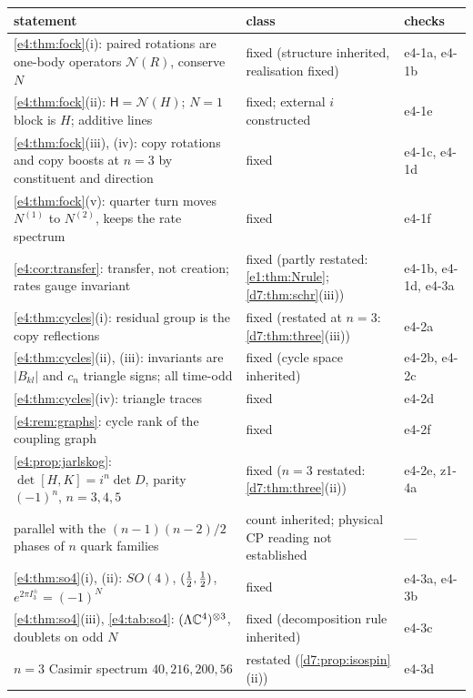 \begin{table}[htbp]
\centering
\footnotesize
\begin{tabular}{@{}>{\raggedright\arraybackslash}p{8.0cm}>{\raggedright\arraybackslash}p{4.8cm}>{\raggedright\arraybackslash}p{2.0cm}@{}}
\toprule
statement & class & checks\\
\midrule
\cref{e4:thm:fock}(i): paired rotations are one-body operators $\mathcal N(R)$, conserve $N$ & fixed (structure inherited, realisation fixed) & e4-1a, e4-1b\\
\cref{e4:thm:fock}(ii): $\mathsf H=\mathcal N(H)$; $N=1$ block is $H$; additive lines & fixed; external $i$ constructed & e4-1e\\
\cref{e4:thm:fock}(iii), (iv): copy rotations and copy boosts at $n=3$ by constituent and direction & fixed & e4-1c, e4-1d\\
\cref{e4:thm:fock}(v): quarter turn moves $N^{(1)}$ to $N^{(2)}$, keeps the rate spectrum & fixed & e4-1f\\
\cref{e4:cor:transfer}: transfer, not creation; rates gauge invariant & fixed (partly restated: \cref{e1:thm:Nrule}; \cref{d7:thm:schr}(iii)) & e4-1b, e4-1d, e4-3a\\
\cref{e4:thm:cycles}(i): residual group is the copy reflections & fixed (restated at $n=3$: \cref{d7:thm:three}(iii)) & e4-2a\\
\cref{e4:thm:cycles}(ii), (iii): invariants are $|B_{kl}|$ and $c_n$ triangle signs; all time-odd & fixed (cycle space inherited) & e4-2b, e4-2c\\
\cref{e4:thm:cycles}(iv): triangle traces & fixed & e4-2d\\
\cref{e4:rem:graphs}: cycle rank of the coupling graph & fixed & e4-2f\\
\cref{e4:prop:jarlskog}: $\det[H,K]=i^n\det D$, parity $(-1)^n$, $n=3,4,5$ & fixed ($n=3$ restated: \cref{d7:thm:three}(ii)) & e4-2e, z1-4a\\
parallel with the $(n-1)(n-2)/2$ phases of $n$ quark families & count inherited; physical CP reading not established & ---\\
\cref{e4:thm:so4}(i), (ii): $SO(4)$, $(\tfrac12,\tfrac12)$, $e^{2\pi I^\pm_3}=(-1)^N$ & fixed & e4-3a, e4-3b\\
\cref{e4:thm:so4}(iii), \cref{e4:tab:so4}: $(\Lambda\mathbb{C}^4)^{\otimes3}$, doublets on odd $N$ & fixed (decomposition rule inherited) & e4-3c\\
$n=3$ Casimir spectrum $40,216,200,56$ & restated (\cref{d7:prop:isospin}(ii)) & e4-3d\\

\end{tabular}
\end{table}
